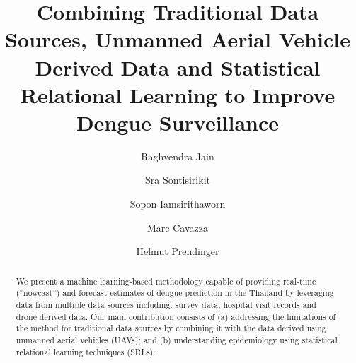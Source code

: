 \documentclass[review]{elsarticle}
\begin{document}
\begin{frontmatter}

\title{Combining Traditional Data Sources, Unmanned Aerial Vehicle Derived Data and Statistical Relational Learning to Improve Dengue Surveillance}




\author[label1]{Raghvendra Jain}
\author[label2]{Sra  Sontisirikit}
\author[label3]{Sopon Iamsirithaworn}
\author[label4]{Marc Cavazza}
\author[label1]{Helmut Prendinger}


\address[label1]{{jain@nii.ac.jp, helmut@nii.ac.jp}\\
	National Institute of Informatics, \\
	2-1-2 Hitotsubashi, Chiyoda-ku, Tokyo, 101-8430, Japan\\}


\address[label2] {{arttioz@gmail.com} \\ 
	Asian Institute of Technology, School of Engineering and Technology, Thailand}

\address[label3]{{iamsiri@gmail.com}\\
	Department of Disease Control Thirteenth Division, Bangkok, Thailand}

\address[label4]{{M.O.Cavazza@kent.ac.uk} \\ 
	School of Engineering and Digital Arts, University of Kent} 





%
%
%

\begin{abstract}
We present a machine learning-based methodology capable of providing real-time (“nowcast”) and forecast estimates of dengue prediction in the Thailand by leveraging data from multiple data sources including: survey data, hospital visit records and drone derived data.  Our main contribution consists of (a) addressing the limitations of the method for traditional data sources by combining it with the data derived using unmanned aerial vehicles (UAVs); and (b) understanding epidemiology using statistical relational learning techniques (SRLs). 


\end{abstract}
\end{frontmatter}
\end{document}
